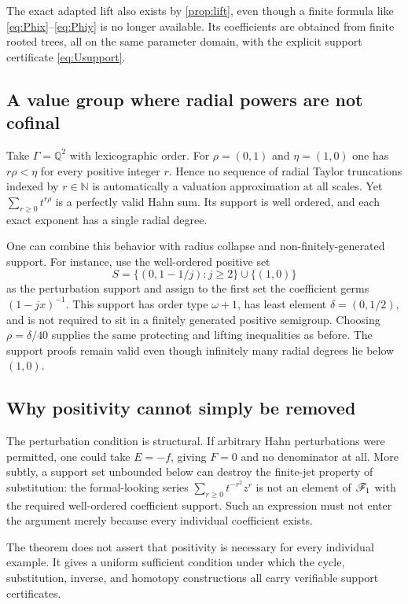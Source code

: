 \documentclass[11pt,letterpaper]{article}
\theoremstyle{definition}
\theoremstyle{remark}
\newcommand{\N}{\mathbb N}\newcommand{\Z}{\mathbb Z}\newcommand{\Q}{\mathbb Q}
\numberwithin{equation}{section}
\begin{document}
The exact adapted lift also exists by \cref{prop:lift}, even though a finite
formula like \eqref{eq:Phix}--\eqref{eq:Phiy} is no longer available.
Its coefficients are obtained from finite rooted trees, all on the same
parameter domain, with the explicit support certificate \eqref{eq:Usupport}.

\subsection{A value group where radial powers are not cofinal}
Take $\Gamma=\Q^2$ with lexicographic order. For
$\rho=(0,1)$ and $\eta=(1,0)$ one has $r\rho<\eta$ for every positive
integer $r$. Hence no sequence of radial Taylor truncations indexed by
$r\in\N$ is automatically a valuation approximation at all scales. Yet
$\sum_{r\geq0}t^{r\rho}$ is a perfectly valid Hahn sum. Its support is
well ordered, and each exact exponent has a single radial degree.

One can combine this behavior with radius collapse and non-finitely-generated
support. For instance, use the well-ordered positive set
\[
 S=\{(0,1-1/j):j\geq2\}\cup\{(1,0)\}
\]
as the perturbation support and assign to the first set the coefficient germs
$(1-jx)^{-1}$. This support has order type $\omega+1$, has least element
$\delta=(0,1/2)$, and is not required to sit in a finitely generated
positive semigroup. Choosing $\rho=\delta/40$ supplies the same protecting
and lifting inequalities as before. The support proofs remain valid even
though infinitely many radial degrees lie below $(1,0)$.

\subsection{Why positivity cannot simply be removed}
The perturbation condition is structural. If arbitrary Hahn perturbations
were permitted, one could take $E=-f$, giving $F=0$ and no denominator at
all. More subtly, a support set unbounded below can destroy the finite-jet
property of substitution: the formal-looking series
$\sum_{r\geq0}t^{-r^2}z^r$ is not an element of $\mathscr F_1$ with the required
well-ordered coefficient support. Such an expression must not enter the
argument merely because every individual coefficient exists.

The theorem does not assert that positivity is necessary for every individual
example. It gives a uniform sufficient condition under which the cycle,
substitution, inverse, and homotopy constructions all carry verifiable
support certificates.
\end{document}
